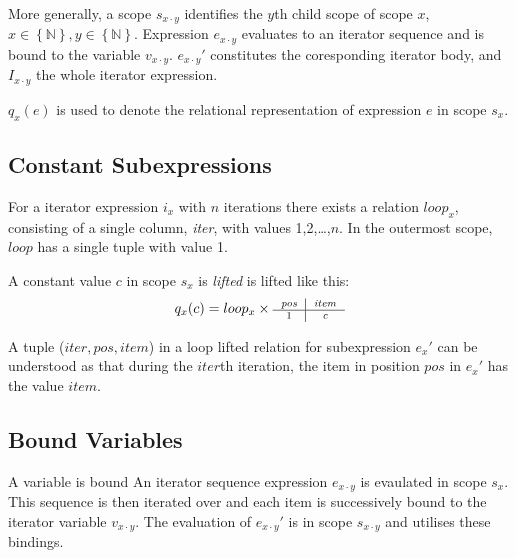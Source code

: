 More generally, a scope $s_{x \cdot y}$ identifies the $y$th child scope of scope $x$, $x \in \left\{
\mathbb{N}\right\}, y \in \left\{ \mathbb{N} \right\}$. Expression $e_{x\cdot y}$ evaluates to an iterator sequence
and is bound to the variable $v_{x \cdot y}$. $e_{x \cdot y}'$ constitutes the coresponding iterator body, and $I_{x \cdot y}$ the whole iterator expression.

$q_{x}(e)$ is used to denote the relational representation of expression $e$ in scope $s_{x}$.


\subsection{Constant Subexpressions}
\label{sect:translation:ll:ConstExprs}

For a iterator expression $i_{x}$ with $n$ iterations there exists a relation $loop_{x}$, consisting of a
single column, \textit{iter}, with values 1,2,\ldots,$n$. In the outermost scope, $loop$ has a single tuple with
value 1.

A constant value $c$ in scope $s_{x}$ is \textit{lifted} is lifted like this:
\begin{equation}
q_{x}(c) =  loop_{x} \times \mbox{\scriptsize \begin{tabular}{c|c} \textit{pos}&\textit{item} \\
\hline 1 & \textit{c}
\end{tabular}}
\label{eq:ll:constLoopLift}
\end{equation}

A tuple ($iter,pos,item$) in a loop lifted relation for subexpression $e_{x}'$ can be understood as that during the
$iter$th iteration, the item in position $pos$ in $e_{x}'$ has the value $item$.

\subsection{Bound Variables}
\label{sect:translation:ll:boundVar}

A variable is bound
An iterator sequence expression $e_{x \cdot y}$ is evaulated in scope $s_{x}$. This sequence is then iterated over
and each item is successively bound to the iterator variable $v_{x \cdot y}$. The evaluation of $e_{x \cdot y}'$
is in scope $s_{x \cdot y}$ and utilises these bindings. 


